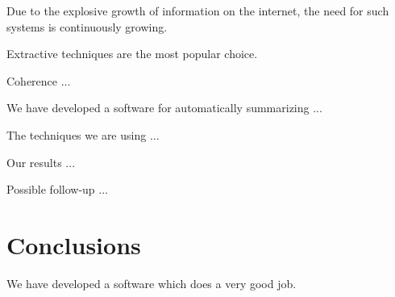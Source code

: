 \documentclass[conference]{IEEEtran}
\begin{document}
Due to the explosive growth of information on the internet, the need for such systems is continuously growing. 

Extractive techniques are the most popular choice.

Coherence ...

We have developed a software for automatically summarizing ...

The techniques we are using ...

Our results ...

Possible follow-up ...

\section{Conclusions}\label{conclusions}
We have developed a software which does a very good job.
\end{document}
